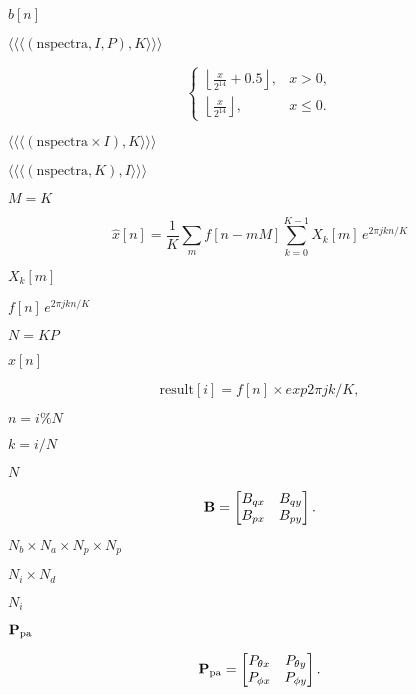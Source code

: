 \documentclass{article}
\begin{document}
$b[n]$
\pagebreak

$ \langle\langle\langle (\text{nspectra},I,P), K \rangle\rangle\rangle $
\pagebreak

\[ \begin{cases} \left\lfloor \frac{x}{2^{14}} + 0.5 \right\rfloor, & x > 0, \\ \left\lfloor \frac{x}{2^{14}} \right\rfloor, & x \le 0. \end{cases} \]
\pagebreak

$\langle\langle\langle (\text{nspectra} \times I), K \rangle\rangle\rangle$
\pagebreak

$\langle\langle\langle(\text{nspectra},K),I\rangle\rangle\rangle$
\pagebreak

$M = K$
\pagebreak

\[ \hat{x}[n] = \frac{1}{K} \sum_m f[n - mM] \sum_{k=0}^{K-1} X_k[m]\,e^{2\pi jkn/K} \]
\pagebreak

$X_k[m]$
\pagebreak

$f[n]\,e^{2\pi jkn/K}$
\pagebreak

$N = KP$
\pagebreak

$\hat{x}[n]$
\pagebreak

\[ \text{result}[i] = f[n] \times exp{2\pi jk/K}, \]
\pagebreak

$n = i \% N$
\pagebreak

$k = i / N$
\pagebreak

$N$
\pagebreak

\[ {\bf B} = \begin{bmatrix} B_{qx} & B_{qy} \\ B_{px} & B_{py} \end{bmatrix}. \]
\pagebreak

$N_b \times N_a \times N_p \times N_p$
\pagebreak

$N_i \times N_d$
\pagebreak

$N_i$
\pagebreak

${\bf P}_\text{pa}$
\pagebreak

\[ {\bf P}_\text{pa} = \begin{bmatrix} P_{\theta x} & P_{\theta y} \\ P_{\phi x} & P_{\phi y} \end{bmatrix}. \]
\pagebreak
\end{document}
